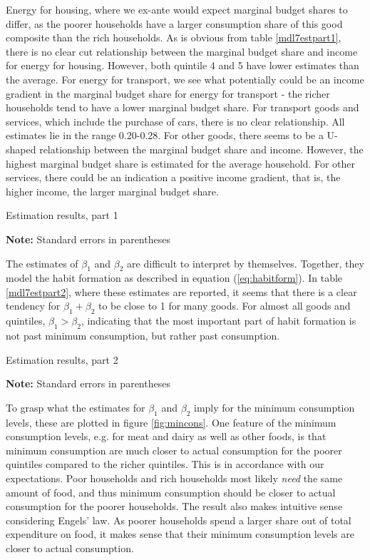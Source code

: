 Energy for housing, where we ex-ante would expect marginal budget shares to differ, as the poorer households have a larger consumption share of this good composite than the rich households. As is obvious from table  \ref{mdl7estpart1}, there is no clear cut relationship between the marginal budget share and income for energy for housing. However, both quintile 4 and 5 have lower estimates than the average. For energy for transport, we see what potentially could be an income gradient in the marginal budget share for energy for transport - the richer households tend to have a lower marginal budget share. For transport goods and services, which include the purchase of cars, there is no clear relationship. All estimates lie in the range 0.20-0.28. For other goods, there seems to be a U-shaped relationship between the marginal budget share and income.  However, the highest marginal budget share is estimated for the average household. For other services, there could be an indication a positive income gradient, that is, the higher income, the larger marginal budget share.

\begin{table}[H]
\renewcommand{\arraystretch}{0.7}
\centering
\caption{Estimation results, part 1}
\label{mdl7estpart1}

\captionsetup{singlelinecheck=off,size=scriptsize}
\setlength{\captionmargin}{10pt}
\caption*{
\textbf{Note:} Standard errors in parentheses}
\end{table}
The estimates of $\beta_1$ and $\beta_2$ are difficult to interpret by themselves. Together, they model the habit formation as described in equation (\ref{eq:habitform}). In table \ref{mdl7estpart2}, where these estimates are reported, it seems that there is a clear tendency for $\beta_1+\beta_2$ to be close to 1 for many goods. For almost all goods and quintiles, $\beta_1>\beta_2$, indicating that the most important part of habit formation is not past minimum consumption, but rather past consumption. 

\begin{table}[H]
\centering
\renewcommand{\arraystretch}{0.7}
\caption{Estimation results, part 2}
\label{mdl7estpart2}

\captionsetup{singlelinecheck=off,size=scriptsize}
\setlength{\captionmargin}{10pt}
\caption*{
\textbf{Note:} Standard errors in parentheses}
\end{table}

To grasp what the estimates for $\beta_1$ and $\beta_2$ imply for the minimum consumption levels, these are plotted in figure  \ref{fig:mincons}. One feature of the minimum consumption levels, e.g. for meat and dairy as well as other foods, is that minimum consumption are much closer to actual consumption for the poorer quintiles compared to the richer quintiles. This is in accordance with our expectations. Poor households and rich households most likely \textit{need} the same amount of food, and thus minimum consumption should be closer to actual consumption for the poorer households. The result also makes intuitive sense considering Engels' law. As poorer households spend a larger share out of total expenditure on food, it makes sense that their minimum consumption levels are closer to actual consumption. 

